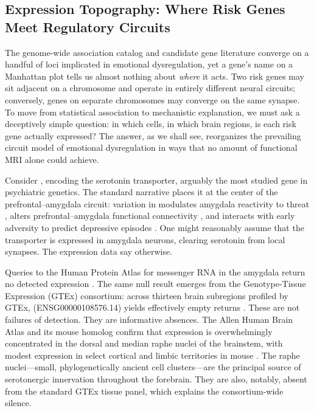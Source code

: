 \subsection*{Expression Topography: Where Risk Genes Meet Regulatory Circuits}

The genome-wide association catalog and candidate gene literature converge on a
handful of loci implicated in emotional dysregulation, yet a gene's name on a
Manhattan plot tells us almost nothing about \emph{where} it acts. Two risk
genes may sit adjacent on a chromosome and operate in entirely different neural
circuits; conversely, genes on separate chromosomes may converge on the same
synapse. To move from statistical association to mechanistic explanation, we
must ask a deceptively simple question: in which cells, in which brain regions,
is each risk gene actually expressed? The answer, as we shall see, reorganizes
the prevailing circuit model of emotional dysregulation in ways that no amount
of functional MRI alone could achieve.

Consider , encoding the serotonin transporter, arguably the most
studied gene in psychiatric genetics. The standard narrative places it at the
center of the prefrontal--amygdala circuit: variation in 
modulates amygdala reactivity to threat \cite{hariri2002serotonin}, alters
prefrontal--amygdala functional connectivity
\cite{pezawas2005slc6a4connectivity}, and interacts with early adversity to
predict depressive episodes \cite{caspi2003influence}. One might reasonably
assume that the transporter is expressed in amygdala neurons, clearing serotonin
from local synapses. The expression data say otherwise.

Queries to the Human Protein Atlas for  messenger RNA in the
amygdala return no detected expression \cite{uhlen2015tissue}. The same null
result emerges from the Genotype-Tissue Expression (GTEx) consortium: across
thirteen brain subregions profiled by GTEx, 
(ENSG00000108576.14) yields effectively empty returns
\cite{gtex2020gtex}. These are not failures of detection. They are informative
absences. The Allen Human Brain Atlas and its mouse homolog confirm that
 expression is overwhelmingly concentrated in the dorsal and
median raphe nuclei of the brainstem, with modest expression in select cortical
and limbic territories in mouse \cite{lein2007genome, hawrylycz2012anatomically}.
The raphe nuclei---small, phylogenetically ancient cell clusters---are the
principal source of serotonergic innervation throughout the forebrain. They are
also, notably, absent from the standard GTEx tissue panel, which explains the
consortium-wide silence.


